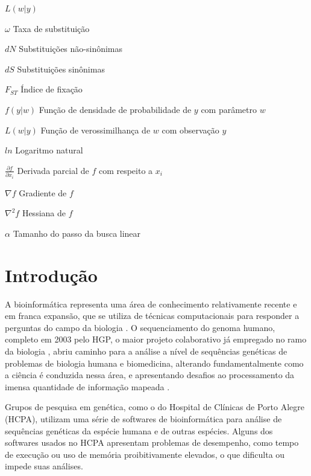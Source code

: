 \documentclass[cic,tc]{iiufrgs}
\begin{document}
\begin{listofsymbols}{$L(w|y)$}
    \item[$\omega$] Taxa de substituição
    \item[$dN$] Substituições não-sinônimas
    \item[$dS$] Substituições sinônimas
    \item[$F_{ST}$] Índice de fixação
    \item[$f(y|w)$] Função de densidade de probabilidade de $y$ com parâmetro $w$
    \item[$L(w|y)$] Função de verossimilhança de $w$ com observação $y$
    \item[$ln$] Logaritmo natural
    \item[$\frac{\partial f}{\partial x_i}$] Derivada parcial de $f$ com respeito a $x_i$
    \item[$\nabla f$] Gradiente de $f$
    \item[$\nabla^2 f$] Hessiana de $f$
    \item[$\alpha$] Tamanho do passo da busca linear
\end{listofsymbols}

\tableofcontents

%
%
%
%

\chapter{Introdução}
\label{chap:intro}

%
%
A bioinformática representa uma área de conhecimento relativamente recente e em
franca expansão, que se utiliza de técnicas computacionais para responder a
perguntas do campo da biologia \cite{baxevanis2020bioinformatics}. O
sequenciamento do genoma humano, completo em 2003 pelo HGP, o maior projeto
colaborativo já empregado no ramo da biologia \cite{tripp2011economic}, abriu
caminho para a análise a nível de sequências genéticas de problemas de biologia
humana e biomedicina, alterando fundamentalmente como a ciência é conduzida
nessa área, e apresentando desafios ao processamento da imensa quantidade de
informação mapeada \cite{baxevanis2020bioinformatics}.

%
%
Grupos de pesquisa em genética, como o do Hospital de Clínicas de Porto Alegre
(HCPA), utilizam uma série de softwares de bioinformática para análise de
sequências genéticas da espécie humana e de outras espécies. Alguns dos
softwares usados no HCPA apresentam problemas de desempenho, como tempo de
execução ou uso de memória proibitivamente elevados, o que dificulta ou impede
suas análises.
\end{document}
